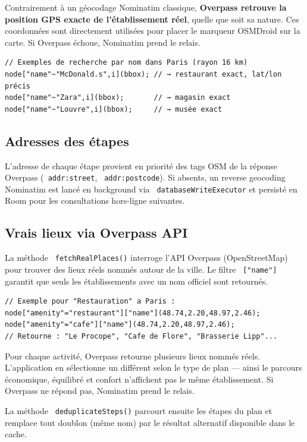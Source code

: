 \documentclass[a4paper,12pt,openany]{report}
\newcommand{\ic}[1]{\texttt{\small\colorbox{lightbg}{\color{navy!90} #1}}}
\begin{document}
Contrairement à un géocodage Nominatim classique, \textbf{Overpass retrouve la
position GPS exacte de l'établissement réel}, quelle que soit sa nature.
Ces coordonnées sont directement utilisées pour placer le marqueur OSMDroid
sur la carte. Si Overpass échoue, Nominatim prend le relais.

\begin{lstlisting}
// Exemples de recherche par nom dans Paris (rayon 16 km)
node["name"~"McDonald.s",i](bbox); // → restaurant exact, lat/lon précis
node["name"~"Zara",i](bbox);       // → magasin exact
node["name"~"Louvre",i](bbox);     // → musée exact
\end{lstlisting}

\subsection{Adresses des étapes}

L'adresse de chaque étape provient en priorité des tags OSM de la réponse
Overpass (\ic{addr:street}, \ic{addr:postcode}). Si absents, un reverse
geocoding Nominatim est lancé en background via \ic{databaseWriteExecutor}
et persisté en Room pour les consultations hors-ligne suivantes.

\subsection{Vrais lieux via Overpass API}

La méthode \ic{fetchRealPlaces()} interroge l'API Overpass (OpenStreetMap)
pour trouver des lieux réels nommés autour de la ville. Le filtre \ic{["name"]}
garantit que seuls les établissements avec un nom officiel sont retournés.

\begin{lstlisting}
// Exemple pour "Restauration" a Paris :
node["amenity"="restaurant"]["name"](48.74,2.20,48.97,2.46);
node["amenity"="cafe"]["name"](48.74,2.20,48.97,2.46);
// Retourne : "Le Procope", "Cafe de Flore", "Brasserie Lipp"...
\end{lstlisting}

Pour chaque activité, Overpass retourne plusieurs lieux nommés réels.
L'application en sélectionne un différent selon le type de plan —
ainsi le parcours économique, équilibré et confort n'affichent pas
le même établissement. Si Overpass ne répond pas, Nominatim prend le relais.

La méthode \ic{deduplicateSteps()} parcourt ensuite les étapes du plan et remplace
tout doublon (même nom) par le résultat alternatif disponible dans le cache.
\end{document}
